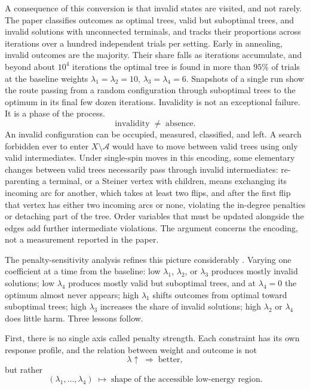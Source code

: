 \documentclass[11pt]{article}
\theoremstyle{definition}
\theoremstyle{remark}
\newcommand{\A}{\mathcal{A}}
\begin{document}
A consequence of this conversion is that invalid states are visited, and not rarely. The paper classifies outcomes as optimal trees, valid but suboptimal trees, and invalid solutions with unconnected terminals, and tracks their proportions across iterations over a hundred independent trials per setting. Early in annealing, invalid outcomes are the majority. Their share falls as iterations accumulate, and beyond about $10^4$ iterations the optimal tree is found in more than $95\%$ of trials at the baseline weights $\lambda_1 = \lambda_2 = 10$, $\lambda_3 = \lambda_4 = 6$. Snapshots of a single run show the route passing from a random configuration through suboptimal trees to the optimum in its final few dozen iterations. Invalidity is not an exceptional failure. It is a phase of the process.
\begin{equation}
\text{invalidity} \;\neq\; \text{absence}.
\end{equation}
An invalid configuration can be occupied, measured, classified, and left. A search forbidden ever to enter $X \setminus \A$ would have to move between valid trees using only valid intermediates. Under single-spin moves in this encoding, some elementary changes between valid trees necessarily pass through invalid intermediates: re-parenting a terminal, or a Steiner vertex with children, means exchanging its incoming arc for another, which takes at least two flips, and after the first flip that vertex has either two incoming arcs or none, violating the in-degree penalties or detaching part of the tree. Order variables that must be updated alongside the edges add further intermediate violations. The argument concerns the encoding, not a measurement reported in the paper.

The penalty-sensitivity analysis refines this picture considerably \cite{li2026}. Varying one coefficient at a time from the baseline:
low $\lambda_1$, $\lambda_2$, or $\lambda_3$ produces mostly invalid solutions;
low $\lambda_4$ produces mostly valid but suboptimal trees, and at $\lambda_4 = 0$ the optimum almost never appears;
high $\lambda_1$ shifts outcomes from optimal toward suboptimal trees;
high $\lambda_3$ increases the share of invalid solutions;
high $\lambda_2$ or $\lambda_4$ does little harm.
Three lessons follow.

First, there is no single axis called penalty strength. Each constraint has its own response profile, and the relation between weight and outcome is not
\begin{equation}
\lambda \uparrow \;\Rightarrow\; \text{better},
\end{equation}
but rather
\begin{equation}
(\lambda_1, \ldots, \lambda_4) \;\longmapsto\; \text{shape of the accessible low-energy region}.
\end{equation}
\end{document}

